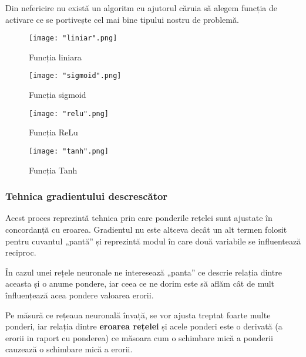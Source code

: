 \documentclass[a4paper, 12pt]{article}
\begin{document}
	Din nefericire nu există un algoritm cu ajutorul căruia să alegem funcția de activare ce se portivește cel mai bine tipului nostru de problemă. \textbf{\cite{v_v_2017}}
	
	\begin{figure}[!htb]
		\begin{minipage}{0.48\textwidth}
			\centering
			\texttt{[image: "liniar".png]}
			\caption{Funcția liniara \textbf{\cite{v_v_2017}}}\label{fig:liniar}
		\end{minipage}\hfill
		\begin{minipage}{0.48\textwidth}
			\centering
			\texttt{[image: "sigmoid".png]}
			\caption{Funcția sigmoid \textbf{\cite{v_v_2017}} }\label{fig:sigmoid}
		\end{minipage}\par
		\begin{minipage}{0.48\textwidth}
			\centering
			\texttt{[image: "relu".png]}
			\caption{Funcția ReLu \textbf{\cite{v_v_2017}} }\label{fig:relu}
		\end{minipage}
		\begin{minipage}{0.48\textwidth}
			\centering
			\texttt{[image: "tanh".png]}
			\caption{Funcția Tanh \textbf{\cite{v_v_2017}}}\label{fig:tanh}
		\end{minipage}
	\end{figure}
	\subsubsection{Tehnica gradientului descrescător}
	
	\quad\space Acest proces reprezintă tehnica prin care ponderile rețelei sunt ajustate în concordanță cu eroarea. Gradientul nu este altceva decât un alt termen folosit pentru cuvantul „pantă” și reprezintă modul în care două variabile se influentează reciproc.
	
	În cazul unei rețele neuronale ne interesează „panta” ce descrie relația dintre aceasta și o anume pondere, iar ceea ce ne dorim este să aflăm cât de mult înfluențează acea pondere valoarea erorii.
	
	Pe măsură ce rețeaua neuronală învață, se vor ajusta treptat foarte multe ponderi, iar relația dintre \textbf{eroarea rețelei} și acele ponderi este o derivată (a erorii in raport cu ponderea) ce măsoara cum o schimbare mică a ponderii cauzează o schimbare mică a erorii.
	
	
	
\end{document}
